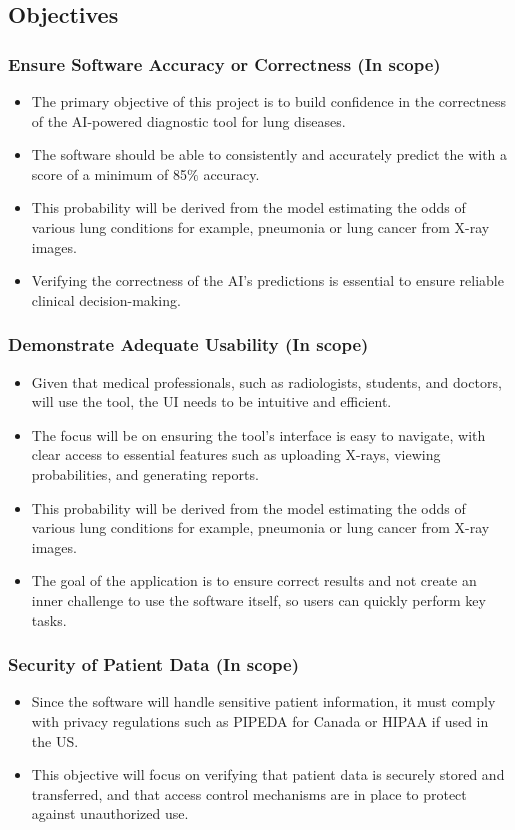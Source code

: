 \documentclass[12pt, titlepage]{article}
\begin{document}
    \subsection{Objectives}
\subsubsection{Ensure Software Accuracy or Correctness (In scope)}
\begin{itemize}
    \item The primary objective of this project is to build confidence in the correctness of the AI-powered diagnostic tool for lung diseases. 
    \item The software should be able to consistently and accurately predict the with a score of a minimum of 85$\%$ accuracy. 
    \item This probability will be derived from the model estimating the odds of  various lung conditions for example,  pneumonia or lung cancer from X-ray images. 
    \item Verifying the correctness of the AI's predictions is essential to ensure reliable clinical decision-making.
\end{itemize}
\subsubsection{Demonstrate Adequate Usability (In scope)}
\begin{itemize}
    \item Given that medical professionals, such as radiologists, students, and doctors, will use the tool, the UI needs to be intuitive and efficient. 
    \item The focus will be on ensuring the tool’s interface is easy to navigate, with clear access to essential features such as uploading X-rays, viewing probabilities, and generating reports.
    \item This probability will be derived from the model estimating the odds of  various lung conditions for example,  pneumonia or lung cancer from X-ray images. 
    \item  The goal of the application is to ensure correct results and not create an inner challenge to use the software itself, so users can quickly perform key tasks.
\end{itemize}
\subsubsection{Security of Patient Data (In scope)}
\begin{itemize}
    \item Since the software will handle sensitive patient information, it must comply with privacy regulations such as PIPEDA for Canada or HIPAA if used in the US. 
    \item This objective will focus on verifying that patient data is securely stored and transferred, and that access control mechanisms are in place to protect against unauthorized use.
\end{itemize}
\end{document}
